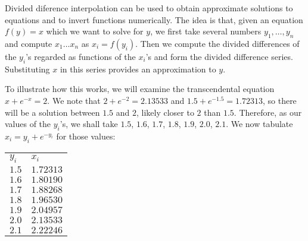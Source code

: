 \documentclass[12pt]{article}
\begin{document}
Divided diference interpolation can be used to obtain approximate
solutions to equations and to invert functions numerically.  The 
idea is that, given an equation $f(y) = x$ which we want to solve
for $y$, we first take several numbers $y_1, \ldots, y_n$ and
compute $x_1 \ldots x_n$ as $x_i = f(y_i)$.  Then we compute the
divided differences of the $y_i$'s regarded as functions of the 
$x_i$'s and form the divided difference series.  Substituting
$x$ in this series provides an approximation to $y$.

To illustrate how this works, we will examine the transcendental
equation $x + e^{-x} = 2$.  We note that $2 + e^{-2} = 2.13533$
and $1.5 + e^{-1.5} = 1.72313$, so there will be a solution
between $1.5$ and $2$, likely closer to $2$ than $1.5$.  Therefore, 
as our values of the $y_i$'s, we shall take $1.5$, $1.6$, $1.7$,
$1.8$, $1.9$, $2.0$, $2.1$.  We now tabulate $x_i = y_i + e^{-y_i}$
for those values:

\begin{tabular}
{| l | l |}
$y_i$ & $x_i$ \\
$1.5$ & $1.72313$ \\
$1.6$ & $1.80190$ \\
$1.7$ & $1.88268$ \\
$1.8$ & $1.96530$ \\
$1.9$ & $2.04957$ \\
$2.0$ & $2.13533$ \\
$2.1$ & $2.22246$
\end{tabular}
\end{document}
